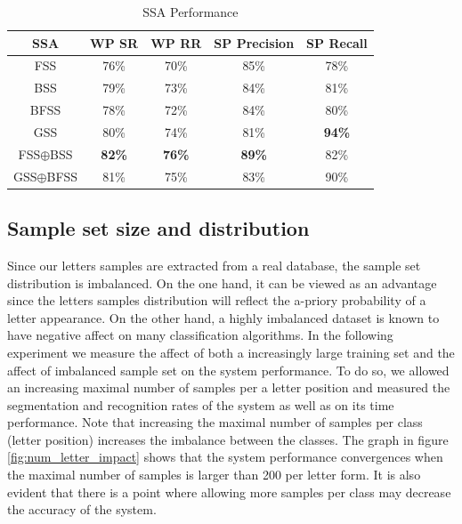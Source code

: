 \documentclass[10pt, conference, compsocconf]{IEEEtran}
\begin{document}
\begin{table}[h]
\caption{SSA Performance}
\begin{tabular}{ | c | c | c | c | c |}
\hline
SSA & WP SR & WP RR & SP Precision & SP Recall\\
\hline                 
  FSS & 76\% & 70\% & 85\% & 78\% \\ 
  \hline
  BSS & 79\% &  73\% & 84\%& 81\% \\
  \hline
  BFSS & 78\% & 72\% & 84\% & 80\%\\ 
  \hline
  GSS & 80\% & 74\% & 81\% & \bf{94}\% \\  
  \hline
  FSS$\oplus$BSS & \bf{82}\% & \bf{76}\% & \bf{89}\% & 82\%\\  
  \hline
  GSS$\oplus$BFSS & 81\% & 75\% & 83\% & 90\% \\
  \hline
\end{tabular}
\centering
\label{table:ss_algorithms_results} 
\end{table}

\subsection{Sample set size and distribution}
Since our letters samples are extracted from a real database, the sample set distribution is imbalanced. 
On the one hand, it can be viewed as an advantage since the letters samples distribution will reflect the a-priory probability of a letter appearance. 
On the other hand, a highly imbalanced dataset is known to have negative affect on many classification algorithms.
In the following experiment we measure the affect of both a increasingly large training set and the affect of imbalanced sample set on the system performance.
To do so, we allowed an increasing maximal number of samples per a letter position and measured the segmentation and recognition rates of the system as well as on its time performance. 
Note that increasing the maximal number of samples per class (letter position) increases the imbalance between the classes. 
The graph in figure \ref{fig:num_letter_impact} shows that the system performance convergences when the maximal number of samples is larger than 200 per letter form. 
It is also evident that there is a point where allowing more samples per class may decrease the accuracy of the system.
\end{document}

